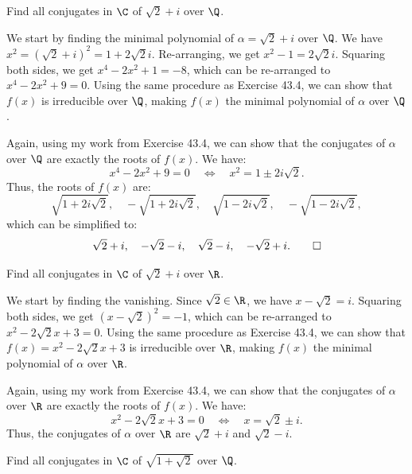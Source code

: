 \begin{problem}[43.5]
  Find all conjugates in $\C$ of $\sqrt{2} + i$ over $\Q$.
\end{problem}

\begin{solution}
  We start by finding the minimal polynomial of $\alpha = \sqrt{2} + i$ over $\Q$. We have $x^2 = (\sqrt{2} + i)^2 = 1 + 2\sqrt{2}i$. Re-arranging, we get $x^2 - 1 = 2\sqrt{2}i$. Squaring both sides, we get $x^4 - 2x^2 + 1 = -8$, which can be re-arranged to $x^4 - 2x^2 + 9 = 0$. Using the same procedure as Exercise 43.4, we can show that $f(x)$ is irreducible over $\Q$, making $f(x)$ the minimal polynomial of $\alpha$ over $\Q$.

  Again, using my work from Exercise 43.4, we can show that the conjugates of $\alpha$ over $\Q$ are exactly the roots of $f(x)$. We have:
  \[%
    x^4 - 2x^2 + 9 = 0 \quad \Longleftrightarrow \quad x^2 = 1 \pm 2i\sqrt{2}
  .\]%
  Thus, the roots of $f(x)$ are:
  \[%
    \sqrt{1 + 2i\sqrt{2}}, \quad -\sqrt{1 + 2i\sqrt{2}}, \quad \sqrt{1 - 2i\sqrt{2}}, \quad -\sqrt{1 - 2i\sqrt{2}}
  ,\]%
  which can be simplified to:
  \[%
    \sqrt{2} + i, \quad -\sqrt{2} - i, \quad \sqrt{2} - i, \quad -\sqrt{2} + i
  .\qedhere\]%
\end{solution}

\begin{problem}[43.6]
  Find all conjugates in $\C$ of $\sqrt{2} + i$ over $\R$.
\end{problem}

\begin{solution}
  We start by finding the vanishing. Since $\sqrt{2} \in \R$, we have $x - \sqrt{2} = i$. Squaring both sides, we get $(x - \sqrt{2})^2 = -1$, which can be re-arranged to $x^2 - 2\sqrt{2}x + 3 = 0$. Using the same procedure as Exercise 43.4, we can show that $f(x) = x^2 - 2\sqrt{2}x + 3$ is irreducible over $\R$, making $f(x)$ the minimal polynomial of $\alpha$ over $\R$.

  Again, using my work from Exercise 43.4, we can show that the conjugates of $\alpha$ over $\R$ are exactly the roots of $f(x)$. We have:
  \[%
    x^2 - 2\sqrt{2}x + 3 = 0 \quad \Longleftrightarrow \quad x = \sqrt{2} \pm i
  .\]%
  Thus, the conjugates of $\alpha$ over $\R$ are $\sqrt{2} + i$ and $\sqrt{2} - i$.
\end{solution}

\begin{problem}[43.7]
  Find all conjugates in $\C$ of $\sqrt{1 + \sqrt{2}}$ over $\Q$.
\end{problem}


